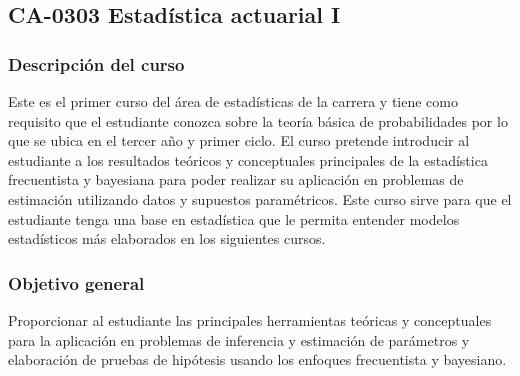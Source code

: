 \newpage
\subsection*{CA-0303 Estadística actuarial I}

\hypertarget{CA0303}{}
\begin{refsection}
\begin{table}[H]
\end{table}

\subsubsection*{Descripción del curso}

Este es el primer curso del área de estadísticas de la carrera y tiene como requisito que el estudiante conozca sobre la teoría básica de probabilidades por lo que se ubica en el tercer año y primer ciclo. El curso pretende introducir al estudiante a los resultados teóricos y conceptuales principales de la estadística frecuentista y bayesiana para poder realizar su aplicación en problemas de estimación utilizando datos y supuestos paramétricos. Este curso sirve para que el estudiante tenga una base en estadística que le permita entender modelos estadísticos más elaborados en los siguientes cursos.

\subsubsection*{Objetivo general}

Proporcionar al estudiante las principales herramientas teóricas y conceptuales para la aplicación en problemas de inferencia y estimación de parámetros y elaboración de pruebas de hipótesis usando los enfoques frecuentista y bayesiano.


\end{refsection}
